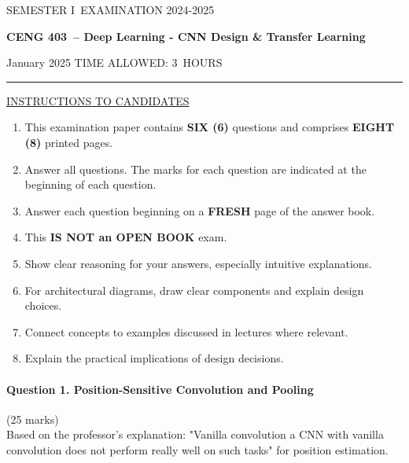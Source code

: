 \documentclass[12pt]{article}
\newcommand{\masunitnumber}{CENG 403}
\newcommand{\examdate}{January 2025}
\newcommand{\academicyear}{2024-2025}
\newcommand{\semester}{I}
\newcommand{\coursename}{Deep Learning - CNN Design \& Transfer Learning}
\newcommand{\numberofhours}{3}
\begin{document}
\setlength{\headsep}{5truemm}
\setlength{\headheight}{14.5truemm}
\setlength{\voffset}{-0.45truein}
\renewcommand{\headrulewidth}{0.0pt}
\begin{center}
SEMESTER \semester\ EXAMINATION \academicyear
\end{center}
\begin{center}
{\bf \masunitnumber\ -- \coursename}
\end{center}
\vspace{20truemm}
\noindent \examdate\hspace{45truemm} TIME ALLOWED: \numberofhours\ HOURS
\vspace{19truemm}
\hrule
\vspace{19truemm}
\noindent\underline{INSTRUCTIONS TO CANDIDATES}
\vspace{8truemm}
\begin{enumerate}
\item This examination paper contains {\bf SIX (6)} questions and comprises 
{\bf EIGHT (8)} printed pages.
\item Answer all questions. 
The marks for each question are indicated at the beginning of each question.
\item Answer each question beginning on a {\bf FRESH} page of the answer book.
\item This {\bf IS NOT an OPEN BOOK} exam.
\item Show clear reasoning for your answers, especially intuitive explanations.
\item For architectural diagrams, draw clear components and explain design choices.
\item Connect concepts to examples discussed in lectures where relevant.
\item Explain the practical implications of design decisions.
\end{enumerate}
\newpage
\lhead{}
\rhead{\masunitnumber}
\chead{}
\lfoot{}
\cfoot{\thepage}
\rfoot{}
\setlength{\footskip}{45pt}

\paragraph{Question 1. Position-Sensitive Convolution and Pooling}{\hfill (25 marks)}\\
Based on the professor's explanation: "Vanilla convolution a CNN with vanilla convolution does not perform really well on such tasks" for position estimation.
\end{document}

